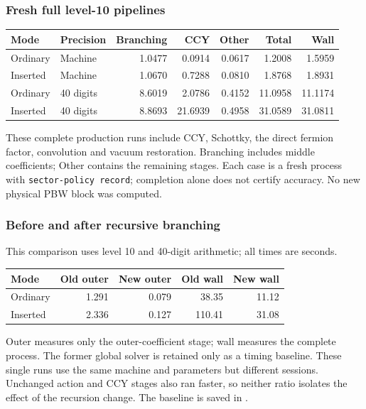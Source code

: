 \subsubsection*{Fresh full level-10 pipelines}
\begin{center}\small
\begin{tabular}{@{}llrrrrr@{}}
\toprule
Mode & Precision & Branching & CCY & Other & Total & Wall \\
\midrule
Ordinary & Machine & 1.0477 & 0.0914 & 0.0617 & 1.2008 & 1.5959 \\
Inserted & Machine & 1.0670 & 0.7288 & 0.0810 & 1.8768 & 1.8931 \\
Ordinary & 40 digits & 8.6019 & 2.0786 & 0.4152 & 11.0958 & 11.1174 \\
Inserted & 40 digits & 8.8693 & 21.6939 & 0.4958 & 31.0589 & 31.0811 \\
\bottomrule
\end{tabular}
\end{center}
These complete production runs include CCY, Schottky, the direct fermion
factor, convolution and vacuum restoration. Branching includes middle
coefficients; Other contains the remaining stages. Each case is a fresh
process with \texttt{sector-policy record}; completion alone does not
certify accuracy. No new physical PBW block was computed.
\begin{samepage}
\subsubsection*{Before and after recursive branching}
This comparison uses level 10 and 40-digit arithmetic; all times are seconds.
\begin{center}\small
\begin{tabular}{@{}lrrrr@{}}
\toprule
Mode & Old outer & New outer & Old wall & New wall \\
\midrule
Ordinary & 1.291 & 0.079 & 38.35 & 11.12 \\
Inserted & 2.336 & 0.127 & 110.41 & 31.08 \\
\bottomrule
\end{tabular}
\end{center}
\end{samepage}
Outer measures only the outer-coefficient stage; wall measures the complete
process. The former global solver is retained only as a timing baseline.
These single runs use the same machine and parameters but different sessions.
Unchanged action and CCY stages also ran faster, so neither ratio isolates
the effect of the recursion change. The baseline is saved in
.
